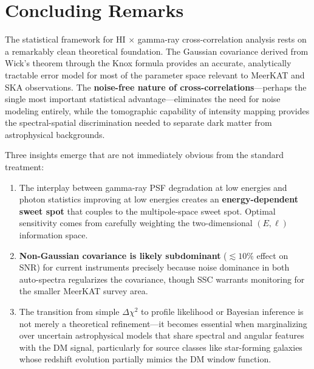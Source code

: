 \documentclass[10pt,a4paper]{article}
\begin{document}
\section{Concluding Remarks}
\label{sec:conclusion}

The statistical framework for HI $\times$ gamma-ray cross-correlation analysis rests on a remarkably clean theoretical foundation. The Gaussian covariance derived from Wick's theorem through the Knox formula provides an accurate, analytically tractable error model for most of the parameter space relevant to MeerKAT and SKA observations. The \textbf{noise-free nature of cross-correlations}---perhaps the single most important statistical advantage---eliminates the need for noise modeling entirely, while the tomographic capability of intensity mapping provides the spectral-spatial discrimination needed to separate dark matter from astrophysical backgrounds.

Three insights emerge that are not immediately obvious from the standard treatment:

\begin{enumerate}[leftmargin=2em]
\item The interplay between gamma-ray PSF degradation at low energies and photon statistics improving at low energies creates an \textbf{energy-dependent sweet spot} that couples to the multipole-space sweet spot. Optimal sensitivity comes from carefully weighting the two-dimensional $(E, \ell)$ information space.

\item \textbf{Non-Gaussian covariance is likely subdominant} ($\lesssim 10\%$ effect on SNR) for current instruments precisely because noise dominance in both auto-spectra regularizes the covariance, though SSC warrants monitoring for the smaller MeerKAT survey area.

\item The transition from simple $\Delta\chi^2$ to profile likelihood or Bayesian inference is not merely a theoretical refinement---it becomes essential when marginalizing over uncertain astrophysical models that share spectral and angular features with the DM signal, particularly for source classes like star-forming galaxies whose redshift evolution partially mimics the DM window function.
\end{enumerate}
\end{document}
